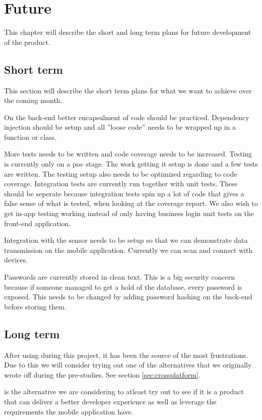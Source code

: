 \chapter{Future}
This chapter will describe the short and long term plans for future development of the product.

\section{Short term}
This section will describe the short term plans for what we want to achieve over the coming month.

On the back-end better encapsulment of code should be practiced.
Dependency injection should be setup and all ''loose code'' needs to be wrapped up in a function or class.

More tests needs to be written and code coverage needs to be increased.
Testing is currently only on a \gls{poc} stage. The work getting it setup is done and a few tests are written.
The testing setup also needs to be optimized regarding to code coverage.
Integration tests are currently run together with unit tests. 
These should be seperate because integration tests spin up a lot of code that gives a false sense of what is tested, when looking at the coverage report.
We also wish to get in-app testing working instead of only having business login unit tests on the front-end application.

Integration with the  sensor needs to be setup so that we can demonstrate  data transmission on the mobile application.
Currently we can scan and connect with  devices.

Passwords are currently stored in clean text. 
This is a big security concern because if someone managed to get a hold of the database, every password is exposed. 
This needs to be changed by adding password hashing on the back-end before storing them.

\section{Long term}
After using  during this project, it has been the source of the most frustrations. 
Due to this we will consider trying out one of the alternatives that we originally wrote off during the pre-studies. See section \ref{sec:crossplatform}. 

 is the alternative we are considering to atleast try out to see if it is a product that can deliver a better developer experience as well as leverage the requirements the mobile application have.


